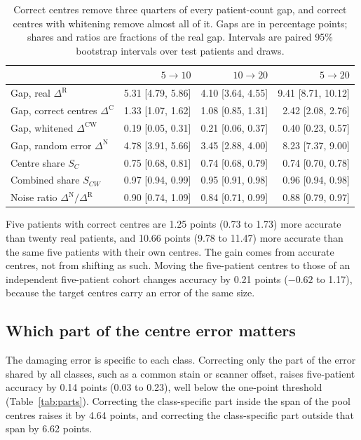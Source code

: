 \documentclass[11pt]{article}
\begin{document}
\begin{table}[htbp]
\centering
\small
\renewcommand{\arraystretch}{1.15}
\begin{tabular}{@{}lrrr@{}}
\toprule
 & $5\to10$ & $10\to20$ & $5\to20$ \\
\midrule
Gap, real $\Delta^{\mathrm R}$ & 5.31 [4.79, 5.86] & 4.10 [3.64, 4.55] & 9.41 [8.71, 10.12] \\
Gap, correct centres $\Delta^{\mathrm C}$ & 1.33 [1.07, 1.62] & 1.08 [0.85, 1.31] & 2.42 [2.08, 2.76] \\
Gap, whitened $\Delta^{\mathrm{CW}}$ & 0.19 [0.05, 0.31] & 0.21 [0.06, 0.37] & 0.40 [0.23, 0.57] \\
Gap, random error $\Delta^{\mathrm N}$ & 4.78 [3.91, 5.66] & 3.45 [2.88, 4.00] & 8.23 [7.37, 9.00] \\
\addlinespace
Centre share $S_C$ & 0.75 [0.68, 0.81] & 0.74 [0.68, 0.79] & 0.74 [0.70, 0.78] \\
Combined share $S_{CW}$ & 0.97 [0.94, 0.99] & 0.95 [0.91, 0.98] & 0.96 [0.94, 0.98] \\
Noise ratio $\Delta^{\mathrm N}/\Delta^{\mathrm R}$ & 0.90 [0.74, 1.09] & 0.84 [0.71, 0.99] & 0.88 [0.79, 0.97] \\
\bottomrule
\end{tabular}
\caption{Correct centres remove three quarters of every patient-count gap, and correct centres with whitening remove almost all of it. Gaps are in percentage points; shares and ratios are fractions of the real gap. Intervals are paired 95\% bootstrap intervals over test patients and draws.}
\label{tab:shares}
\end{table}

\noindent Five patients with correct centres are 1.25 points (0.73 to 1.73) more accurate than twenty real patients, and 10.66 points (9.78 to 11.47) more accurate than the same five patients with their own centres. The gain comes from accurate centres, not from shifting as such. Moving the five-patient centres to those of an independent five-patient cohort changes accuracy by 0.21 points ($-0.62$ to 1.17), because the target centres carry an error of the same size.

\subsection{Which part of the centre error matters}
\label{sec:parts-results}
The damaging error is specific to each class. Correcting only the part of the error shared by all classes, such as a common stain or scanner offset, raises five-patient accuracy by 0.14 points (0.03 to 0.23), well below the one-point threshold (Table~\ref{tab:parts}). Correcting the class-specific part inside the span of the pool centres raises it by 4.64 points, and correcting the class-specific part outside that span by 6.62 points.
\end{document}
